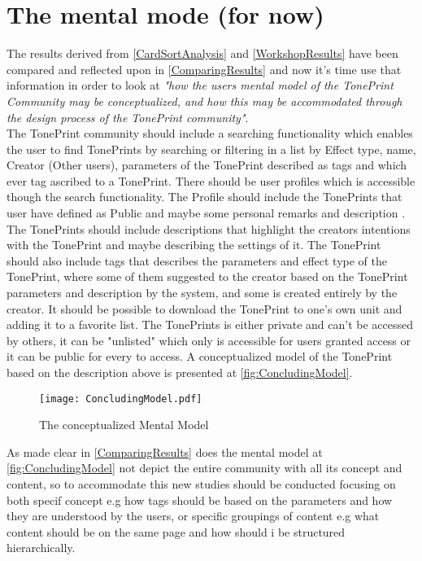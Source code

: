 \section{The mental mode (for now)}
\label{MentalModelForNow}
%
The results derived from \autoref{CardSortAnalysis} and \autoref{WorkshopResults} have been compared and reflected upon in \autoref{ComparingResults} and now it's time use that information in order to look at \textit{"how the users mental model of the TonePrint Community may be conceptualized, and how this may be accommodated through the design process of the TonePrint community"}.\\
The TonePrint community should include a searching functionality which enables the user to find TonePrints by searching or filtering in a list by Effect type, name, Creator (Other users), parameters of the TonePrint described as tags and which ever tag ascribed to a TonePrint. There should be user profiles which is accessible though the search functionality. The Profile should include the TonePrints that user have defined as Public and maybe some personal remarks and description . The TonePrints should include descriptions that highlight the creators intentions with the TonePrint and maybe describing the settings of it. The TonePrint should also include tags that describes the parameters and effect type of the TonePrint, where some of them suggested to the creator based on the TonePrint parameters and description by the system, and some is created entirely by the creator. It should be possible to download the TonePrint to one's own unit and adding it to a favorite list. The TonePrints is either private and can't be accessed by others, it can be "unlisted" which only is accessible for users granted access or it can be public for every to access. A conceptualized model of the TonePrint based on the description above is presented at \autoref{fig:ConcludingModel}.
%
\begin{figure}[H]
	\centering
	\texttt{[image: ConcludingModel.pdf]}
	\caption{The conceptualized Mental Model}
	\label{fig:ConcludingModel}
\end{figure}
%
As made clear in \autoref{ComparingResults} does the mental model at \autoref{fig:ConcludingModel} not depict the entire community with all its concept and content, so to accommodate this new studies should be conducted focusing on both specif concept e.g how tags should be based on the parameters and how they are understood by the users, or specific groupings of content e.g what content should be on the same page and how should i be structured hierarchically. \\
